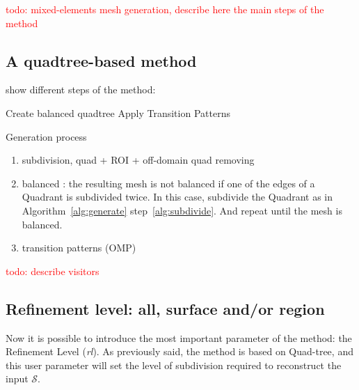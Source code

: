 \documentclass[10pt]{article}
\begin{document}
\textcolor{red}{todo: mixed-elements mesh generation, describe here the main steps of the method}

\subsection{A quadtree-based method}
show different steps of the method: 

\begin{algorithm}[H]
\SetAlgoLined
{}
 \nl {}
 \nl Create balanced quadtree\; \label{alg:goto}
 \nl Apply Transition Patterns\;
 \caption{Generation process}
 \label{alg:generate}
\end{algorithm}


\begin{enumerate}
\item subdivision, quad + ROI + off-domain quad removing
\item balanced : the resulting mesh is not balanced if one of the edges of a Quadrant is subdivided twice. In this case, subdivide the Quadrant as in Algorithm~\ref{alg:generate} step~\ref{alg:subdivide}. And repeat until the mesh is balanced.
\item transition patterns (OMP)
\end{enumerate}

\textcolor{red}{todo: describe visitors}


\subsection{Refinement level: all, surface and/or region}
\label{s:refinement}
Now it is possible to introduce the most important parameter of the method: the Refinement Level (\textit{rl}).
As previously said, the method is based on Quad-tree, and this user parameter will set the level of subdivision required to reconstruct the input $\mathcal{S}$.
\end{document}

